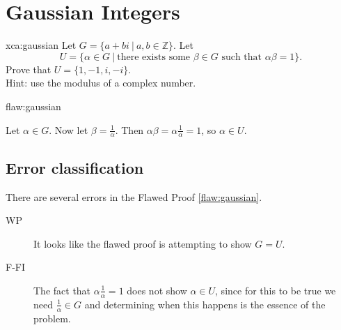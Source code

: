 \section{Gaussian Integers}

\begin{xca}{xca:gaussian}
Let $G = \{a + bi \: | \: a,b \in \mathbb{Z}\}$. Let
$$U = \{\alpha \in G \:| \: \text{there exists some } \beta \in G \text{ such that } \alpha\beta = 1\}. $$
Prove that $U = \{1,-1,i,-i\}$. \\

\noindent Hint: use the modulus of a complex number.

\end{xca}

\begin{flaw}{flaw:gaussian} %

Let $\alpha \in G$. Now let $\beta = \frac{1}{\alpha}$. Then $\alpha\beta = \alpha\frac{1}{\alpha} = 1$, so $\alpha \in U$.

\end{flaw}

\clearpage
\subsection{Error classification}


There are several errors
 in the Flawed Proof \ref{flaw:gaussian}.

 \begin{description}
    \item[WP] It looks like the flawed proof is attempting to show $G = U$.
    \item[F-FI] The fact that $\alpha\frac{1}{\alpha} = 1$ does not show $\alpha \in U$, since for this to be true we need $\frac{1}{\alpha} \in G$ and determining when this happens is the essence of the problem.

 	
 \end{description}



